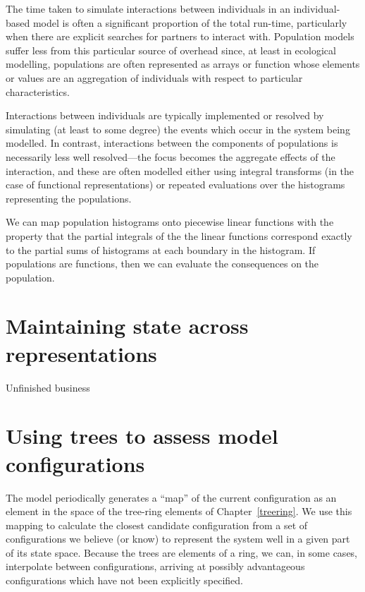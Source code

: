 The time taken to simulate interactions between individuals in an
individual-based model is often a significant proportion of the total
run-time, particularly when there are explicit searches for partners
to interact with.  Population models suffer less from this particular
source of overhead since, at least in ecological modelling,
populations are often represented as arrays or function whose elements
or values are an aggregation of individuals with respect to particular
characteristics.

Interactions between individuals are typically implemented or resolved
by simulating (at least to some degree) the events which occur in the
system being modelled. In contrast, interactions between the
components of populations is necessarily less well resolved---the
focus becomes the aggregate effects of the interaction, and these are
often modelled either using integral transforms (in the case of
functional representations) or repeated evaluations over the
histograms representing the populations.

We can map population histograms onto piecewise linear functions with
the property that the partial integrals of the the linear functions
correspond exactly to the partial sums of histograms at each boundary
in the histogram.  If populations are functions, then we can evaluate
the consequences on the population.












\section{Maintaining state across representations}

Unfinished business

\section{Using trees to assess model configurations}

The model periodically generates a ``map'' of the current
configuration as an element in the space of the tree-ring elements of
Chapter~\ref{treering}.  We use this mapping to calculate the
closest candidate configuration from a set of configurations we
believe (or know) to represent the system well in a given part of its
state space. Because the trees are elements of a ring, we can, in some cases,
interpolate between configurations, arriving at possibly advantageous
configurations which have not been explicitly specified.

